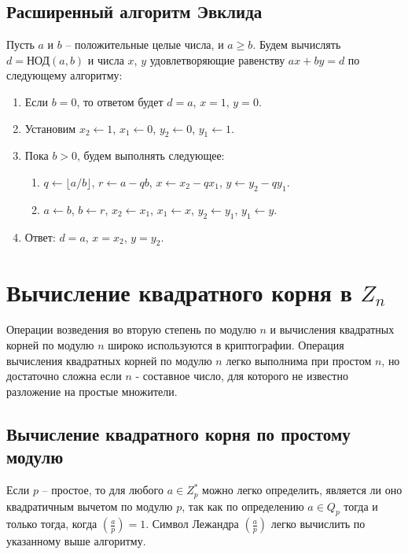 \documentclass[12pt,a4paper]{report}
\def \jacobi #1#2{\left(\frac{#1}{#2}\right)}
\begin{document}
\subsection{Расширенный алгоритм Эвклида}

Пусть $a$ и $b$ -- положительные целые числа, и $a \geq b$.
Будем вычислять $d = \textrm{НОД}(a, b)$ и числа $x$, $y$ удовлетворяющие равенству $ax + by = d$ по следующему алгоритму:

\begin{enumerate}
\item Если $b = 0$, то ответом будет $d = a$, $x = 1$, $y = 0$.
\item Установим $x_2 \leftarrow 1$, $x_1 \leftarrow 0$, $y_2 \leftarrow 0$,
$y_1 \leftarrow 1$.
\item Пока $b > 0$, будем выполнять следующее:
\begin{enumerate}
\item $q \leftarrow \lfloor a / b \rfloor$, $r \leftarrow a - qb$,
$x \leftarrow x_2 - qx_1$, $y \leftarrow y_2 - qy_1$.
\item $a \leftarrow b$, $b \leftarrow r$, $x_2 \leftarrow x_1$,
$x_1 \leftarrow x$, $y_2 \leftarrow y_1$, $y_1 \leftarrow y$.
\end{enumerate}
\item Ответ: $d = a$, $x = x_2$, $y = y_2$.
\end{enumerate}

\section{Вычисление квадратного корня в $Z_n$}

Операции возведения во вторую степень по модулю $n$ и вычисления квадратных
корней по модулю $n$ широко используются в криптографии.
Операция вычисления квадратных корней по модулю $n$ легко выполнима при простом
$n$, но достаточно сложна если $n$ - составное число, для которого не известно
разложение на простые множители.

\subsection{Вычисление квадратного корня по простому модулю}

Если $p$ -- простое, то для любого $a \in Z^*_p$ можно легко определить,
является ли оно квадратичным вычетом по модулю $p$, так как по определению $a
\in Q_p$ тогда и только тогда, когда $\jacobi{a}{p} = 1$. Символ Лежандра
$\jacobi{a}{p}$ легко вычислить по указанному выше алгоритму.\\
\end{document}
